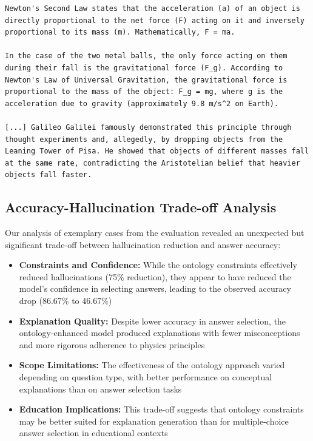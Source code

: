 \begin{lstlisting}[style=mystyle, caption={Baseline model on free fall with hallucination identified}, label={lst:baseline-free-fall}]
Newton's Second Law states that the acceleration (a) of an object is directly proportional to the net force (F) acting on it and inversely proportional to its mass (m). Mathematically, F = ma.

In the case of the two metal balls, the only force acting on them during their fall is the gravitational force (F_g). According to Newton's Law of Universal Gravitation, the gravitational force is proportional to the mass of the object: F_g = mg, where g is the acceleration due to gravity (approximately 9.8 m/s^2 on Earth).

[...] Galileo Galilei famously demonstrated this principle through thought experiments and, allegedly, by dropping objects from the Leaning Tower of Pisa. He showed that objects of different masses fall at the same rate, contradicting the Aristotelian belief that heavier objects fall faster.
\end{lstlisting}

\subsection{Accuracy-Hallucination Trade-off Analysis}
Our analysis of exemplary cases from the evaluation revealed an unexpected but significant trade-off between hallucination reduction and answer accuracy:

\begin{itemize}
    \item \textbf{Constraints and Confidence:} While the ontology constraints effectively reduced hallucinations (75\% reduction), they appear to have reduced the model's confidence in selecting answers, leading to the observed accuracy drop (86.67\% to 46.67\%)
    
    \item \textbf{Explanation Quality:} Despite lower accuracy in answer selection, the ontology-enhanced model produced explanations with fewer misconceptions and more rigorous adherence to physics principles
    
    \item \textbf{Scope Limitations:} The effectiveness of the ontology approach varied depending on question type, with better performance on conceptual explanations than on answer selection tasks
    
    \item \textbf{Education Implications:} This trade-off suggests that ontology constraints may be better suited for explanation generation than for multiple-choice answer selection in educational contexts
\end{itemize}

